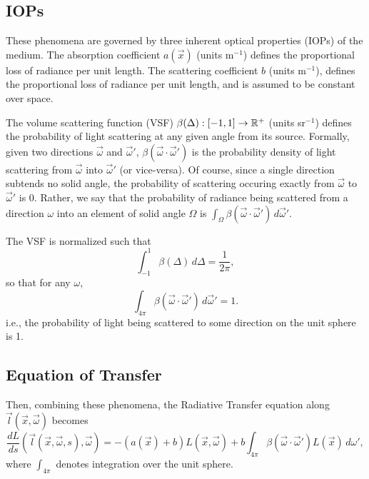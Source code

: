 \subsection{IOPs}
These phenomena are governed by three inherent optical properties (IOPs) of the
medium.
The absorption coefficient $a(\vec{x})$ (units m$^{-1}$) defines the
proportional loss of radiance per unit length.
The scattering coefficient $b$ (units m$^{-1}$), defines the proportional loss
of radiance per unit length, and is assumed to be constant over space.

The volume scattering function (VSF) $\beta(\Delta): [-1, 1] \to \mathbb{R}^+$ (units sr$^{-1}$) defines the probability of light scattering at any given angle from its source.
Formally, given two directions $\vec{\omega}$ and $\vec{\omega}'$, $\beta(\vec{\omega} \cdot \vec{\omega}')$ is the probability density of light scattering from $\vec{\omega}$ into $\vec{\omega}'$ (or vice-versa).
Of course, since a single direction subtends no solid angle, the probability of scattering occuring exactly from $\vec{\omega}$ to $\vec{\omega}'$ is 0.
Rather, we say that the probability of radiance being scattered from a direction $\omega$ into an element of solid angle $\Omega$ is $\int_\Omega \beta(\vec{\omega} \cdot \vec{\omega}')\, d\vec{\omega}'$.

The VSF is normalized such that
\begin{equation}
  \int_{-1}^1\beta(\Delta)\, d\Delta=\frac{1}{2\pi},
\end{equation}
so that for any $\omega$,
\begin{equation}
  \int_{4\pi}\beta(\vec{\omega}\cdot\vec{\omega}')\, d\vec{\omega}' = 1.
\end{equation}
i.e., the probability of light being scattered to some direction on the unit sphere is 1.

\subsection{Equation of Transfer}
Then, combining these phenomena, the Radiative Transfer equation along
$\vec{l}(\vec{x}, \vec{\omega})$ becomes
\begin{equation}
  \label{eqn:rte1d}
  \frac{dL}{ds}(\vec{l}(\vec{x}, \vec{\omega}, s), \vec{\omega})
  = -(a(\vec{x}) + b)L(\vec{x}, \vec{\omega})
  + b \int_{4\pi} \beta(\vec{\omega}\cdot\vec{\omega}') L(\vec{x})\, d\omega',
\end{equation}
where $\int_{4\pi}$ denotes integration over the unit sphere.

